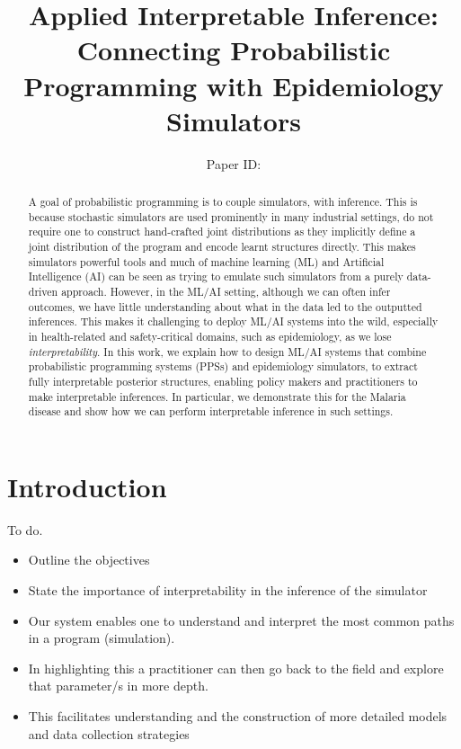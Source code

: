 \documentclass{article}
\title{Applied Interpretable Inference: Connecting Probabilistic Programming with Epidemiology Simulators}
\author{%
Paper ID: }
\begin{document}

\maketitle

\begin{abstract}

A goal of probabilistic programming is to couple simulators, with inference. This is 
because stochastic simulators are used prominently in many industrial settings,
do not require one to construct hand-crafted joint distributions as they implicitly 
define a joint distribution of the program and encode learnt structures 
directly. This makes simulators powerful tools and much of machine learning (ML) and 
Artificial Intelligence (AI)
can be seen as trying to emulate such simulators from a purely data-driven approach.
However, in the 
ML/AI setting, although we can often infer outcomes, we have little understanding about what 
in the data led to the outputted inferences. 
This makes it challenging to deploy ML/AI systems into the wild, especially in health-related and safety-critical domains, such
as epidemiology, as we lose \emph{interpretability}. 
In this work, we explain how to design ML/AI systems that combine
probabilistic programming systems (PPSs) and epidemiology simulators, to extract
fully interpretable posterior structures, enabling policy makers 
and practitioners to make interpretable inferences. 
In particular, we demonstrate this for the Malaria disease and show how we can 
perform interpretable inference in such settings.
\end{abstract}

\section{Introduction}

To do. 

\begin{itemize}

\item Outline the objectives
\item State the importance of interpretability in the inference of the simulator
\item Our system enables one to understand and interpret the most common paths in a program (simulation).
\item In highlighting this a practitioner can then go back to the field and explore that parameter/s in more depth.
\item This facilitates understanding and the construction of more detailed models and data collection strategies


\end{itemize}
\end{document}
